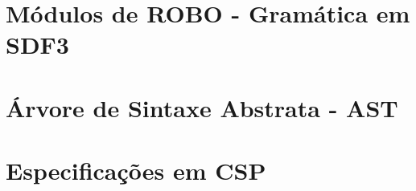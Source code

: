 \appendix

\chapter{Módulos de ROBO - Gramática em SDF3}
\label{apendice1}






\chapter{Árvore de Sintaxe Abstrata - AST}
\label{apendice2}


\chapter{Especificações em CSP}
\label{apendice4}

